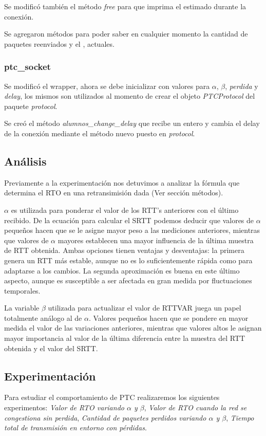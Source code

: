     Se modific\'o tambi\'en el m\'etodo \textit{free} para que imprima el
    \rto{} estimado durante la conexi\'on.      
    
    Se agregaron m\'etodos para poder saber en cualquier momento la cantidad
    de paquetes reenviados y el \rto{}, \rtt{} actuales.  
    
    \subsubsection{ptc\_socket}
    Se modific\'o el wrapper, ahora se debe inicializar con valores para 
    $\alpha$, $\beta$, \textit{perdida} y \textit{delay}, los mismos son
    utilizados al momento de crear el objeto \textit{PTCProtocol} del 
    paquete \textit{protocol}.
    
    Se cre\'o el m\'etodo \textit{alumnos\_change\_delay} que recibe un
    entero y cambia el delay de la conexi\'on mediante el m\'etodo nuevo
    puesto en \textit{protocol}.
           
  \subsection{An\'alisis}
    Previamente a la experimentación nos detuvimos a analizar la fórmula que
    determina el RTO en una retransimisión dada (Ver sección métodos).

    $\alpha$ es utilizada para ponderar el valor de los RTT's anteriores con
    el último recibido. De la ecuación para calcular el SRTT podemos deducir
    que valores de $\alpha$ peque\~nos hacen que se le asigne mayor peso a
    las mediciones anteriores, mientras que valores de $\alpha$ mayores
    establecen una mayor influencia de la última muestra de RTT obtenida. 
    Ambas opciones tienen ventajas y desventajas: la primera genera un RTT
    más estable, aunque no es lo suficientemente rápida como para adaptarse
    a los cambios. La segunda aproximación es buena en este último aspecto,
    aunque es susceptible a ser afectada en gran medida por fluctuaciones
    temporales.

    La variable $\beta$ utilizada para actualizar el valor de RTTVAR
    juega un papel totalmente análogo al de $\alpha$. Valores peque\~nos
    hacen que se pondere en mayor medida el valor de las variaciones
    anteriores, mientras que valores altos le asignan mayor importancia al
    valor de la última diferencia entre la muestra del RTT obtenida y el
    valor del SRTT.
    
  \subsection{Experimentaci\'on}  
    Para estudiar el comportamiento de PTC realizaremos los siguientes
    experimentos:
    \emph{Valor de RTO variando $\alpha$ y $\beta$}, 
    \emph{Valor de RTO cuando la red se congestiona sin perdida},
    \emph{Cantidad de paquetes perdidos variando $\alpha$ y $\beta$},
    \emph{Tiempo total de transmisi\'on en entorno con p\'erdidas}.
